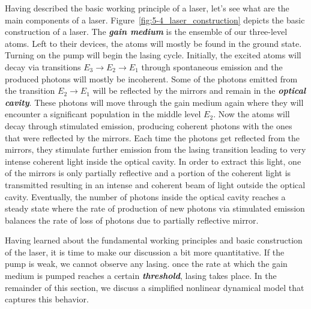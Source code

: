 Having described the basic working principle of a laser, let's see what are the main components of a laser.
Figure~\ref{fig:5-4_laser_construction} depicts the basic construction of a laser.
The \textit{\textbf{gain medium}} is the ensemble of our three-level atoms.
Left to their devices, the atoms will mostly be found in the ground state.
Turning on the pump will begin the lasing cycle.
Initially, the excited atoms will decay via transitions $E_3 \rightarrow E_2 \rightarrow E_1$ through spontaneous emission and the produced photons will mostly be incoherent.
Some of the photons emitted from the transition $E_2 \rightarrow E_1$ will be reflected by the mirrors and remain in the \textit{\textbf{optical cavity}}.
These photons will move through the gain medium again where they will encounter a significant population in the middle level $E_2$.
Now the atoms will decay through stimulated emission, producing coherent photons with the ones that were reflected by the mirrors.
Each time the photons get reflected from the mirrors, they stimulate further emission from the lasing transition leading to very intense coherent light inside the optical cavity.
In order to extract this light, one of the mirrors is only partially reflective and a portion of the coherent light is transmitted resulting in an intense and coherent beam of light outside the optical cavity.
Eventually, the number of photons inside the optical cavity reaches a steady state where the rate of production of new photons via stimulated emission balances the rate of loss of photons due to partially reflective mirror.

Having learned about the fundamental working principles and basic construction of the laser, it is time to make our discussion a bit more quantitative.
If the pump is weak, we cannot observe any lasing.
once the rate at which the gain medium is pumped reaches a certain \textit{\textbf{threshold}}, lasing takes place.
In the remainder of this section, we discuss a simplified nonlinear dynamical model that captures this behavior.

